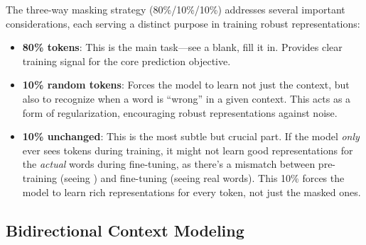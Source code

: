 The three-way masking strategy (80\%/10\%/10\%) addresses several important considerations, each serving a distinct purpose in training robust representations:
\begin{itemize}
\item \textbf{80\% \mask{} tokens}: This is the main task---see a blank, fill it in. Provides clear training signal for the core prediction objective.
\item \textbf{10\% random tokens}: Forces the model to learn not just the context, but also to recognize when a word is ``wrong'' in a given context. This acts as a form of regularization, encouraging robust representations against noise.
\item \textbf{10\% unchanged}: This is the most subtle but crucial part. If the model \emph{only} ever sees \mask{} tokens during training, it might not learn good representations for the \emph{actual} words during fine-tuning, as there's a mismatch between pre-training (seeing \mask{}) and fine-tuning (seeing real words). This 10\% forces the model to learn rich representations for every token, not just the masked ones.
\end{itemize}

\subsection{Bidirectional Context Modeling}

